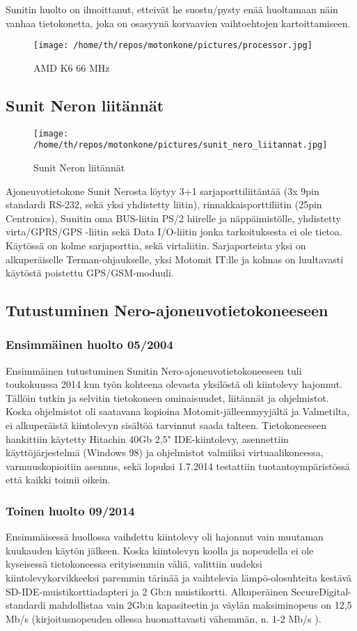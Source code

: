 \documentclass[11pt,a4paper,oneside,article]{memoir}
\begin{document}
Sunitin huolto on ilmoittanut, etteivät he suostu/pysty enää huoltamaan näin vanhaa tietokonetta, joka on osasyynä korvaavien vaihtoehtojen kartoittamiseen.

\begin{figure}[H]
\centering
\texttt{[image: /home/th/repos/motonkone/pictures/processor.jpg]}
\caption{AMD K6 66 MHz}
\end{figure}

\subsection{Sunit Neron liitännät}
\begin{figure}[H]
\centering
\texttt{[image: /home/th/repos/motonkone/pictures/sunit\_nero\_liitannat.jpg]}
\caption{Sunit Neron liitännät}
\end{figure}

Ajoneuvotietokone Sunit Nerosta löytyy 3+1 sarjaporttiliitäntää (3x 9pin standardi RS-232, sekä yksi yhdistetty liitin), rinnakkaisporttiliitin (25pin Centronics), Sunitin oma BUS-liitin PS/2 hiirelle ja näppäimistölle, yhdistetty virta/GPRS/GPS -liitin sekä Data I/O-liitin jonka tarkoituksesta ei ole tietoa. Käytössä on kolme sarjaporttia, sekä virtaliitin. Sarjaporteista yksi on alkuperäiselle Terman-ohjaukselle, yksi Motomit IT:lle ja kolmas on luultavasti käytöstä poistettu GPS/GSM-moduuli.

\subsection{Tutustuminen Nero-ajoneuvotietokoneeseen}
\subsubsection{Ensimmäinen huolto 05/2004}
Ensimmäinen tutustuminen Sunitin Nero-ajoneuvotietokoneeseen tuli toukokuussa 2014 kun työn kohteena olevasta yksilöstä oli kiintolevy hajonnut. Tällöin tutkin ja selvitin tietokoneen ominaisuudet, liitännät ja ohjelmistot. Koska ohjelmistot oli saatavana kopioina Motomit-jälleenmyyjältä ja Valmetilta, ei alkuperäistä kiintolevyn sisältöä tarvinnut saada talteen. Tietokoneeseen hankittiin käytetty Hitachin 40Gb 2,5" IDE-kiintolevy, asennettiin käyttöjärjestelmä (Windows 98) ja ohjelmistot valmiiksi virtuaalikoneessa, varmuuskopioitiin asennus, sekä lopuksi 1.7.2014 testattiin tuotantoympäristössä että kaikki toimii oikein.

\subsubsection{Toinen huolto 09/2014}
Ensimmäisessä huollossa vaihdettu kiintolevy oli hajonnut vain muutaman kuukauden käytön jälkeen. Koska kiintolevyn koolla ja nopeudella ei ole kyseisessä tietokoneessa erityisemmin väliä, valittiin uudeksi kiintolevykorvikkeeksi paremmin tärinää ja vaihtelevia lämpö-olosuhteita kestävä SD-IDE-muistikorttiadapteri ja 2 Gb:n muistikortti. Alkuperäinen SecureDigital-standardi mahdollistaa vain 2Gb:n kapasiteetin ja väylän maksiminopeus on 12,5 Mb/s (kirjoitusnopeuden ollessa huomattavasti vähemmän, n. 1-2 Mb/s )\cite{sd:2gb}.
\end{document}
